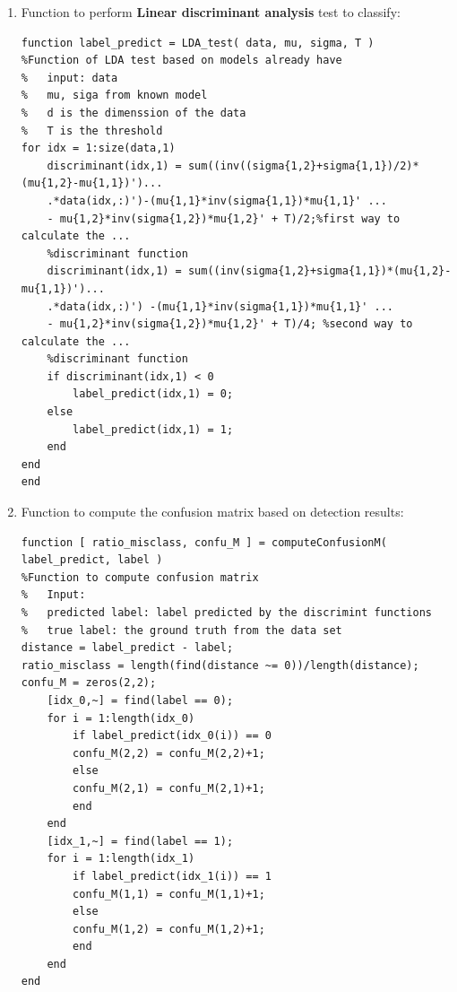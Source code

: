 \documentclass[a4paper]{article}
\begin{document}
\begin{spacing}{2.0}
\begin{enumerate}
\item Function to perform \textbf{Linear discriminant analysis} test to classify:
\begin{lstlisting}
function label_predict = LDA_test( data, mu, sigma, T )
%Function of LDA test based on models already have
%	input: data
%	mu, siga from known model
%	d is the dimenssion of the data
%	T is the threshold
for idx = 1:size(data,1)
	discriminant(idx,1) = sum((inv((sigma{1,2}+sigma{1,1})/2)*(mu{1,2}-mu{1,1})')...
	.*data(idx,:)')-(mu{1,1}*inv(sigma{1,1})*mu{1,1}' ...
	- mu{1,2}*inv(sigma{1,2})*mu{1,2}' + T)/2;%first way to calculate the ...
	%discriminant function
	discriminant(idx,1) = sum((inv(sigma{1,2}+sigma{1,1})*(mu{1,2}-mu{1,1})')...
	.*data(idx,:)') -(mu{1,1}*inv(sigma{1,1})*mu{1,1}' ...
	- mu{1,2}*inv(sigma{1,2})*mu{1,2}' + T)/4; %second way to calculate the ...
	%discriminant function
    if discriminant(idx,1) < 0
        label_predict(idx,1) = 0;
    else
        label_predict(idx,1) = 1;
    end
end
end
\end{lstlisting}
\item Function to compute the confusion matrix based on detection results:
\begin{lstlisting}
function [ ratio_misclass, confu_M ] = computeConfusionM( label_predict, label )
%Function to compute confusion matrix
%   Input:
%   predicted label: label predicted by the discrimint functions
%   true label: the ground truth from the data set
distance = label_predict - label;
ratio_misclass = length(find(distance ~= 0))/length(distance);
confu_M = zeros(2,2);
    [idx_0,~] = find(label == 0);
    for i = 1:length(idx_0)
        if label_predict(idx_0(i)) == 0
        confu_M(2,2) = confu_M(2,2)+1;
        else
        confu_M(2,1) = confu_M(2,1)+1;
        end
    end
    [idx_1,~] = find(label == 1);
    for i = 1:length(idx_1)
        if label_predict(idx_1(i)) == 1
        confu_M(1,1) = confu_M(1,1)+1;
        else
        confu_M(1,2) = confu_M(1,2)+1;
        end
    end
end
\end{lstlisting}
\end{enumerate}

\end{spacing}
\end{document}
